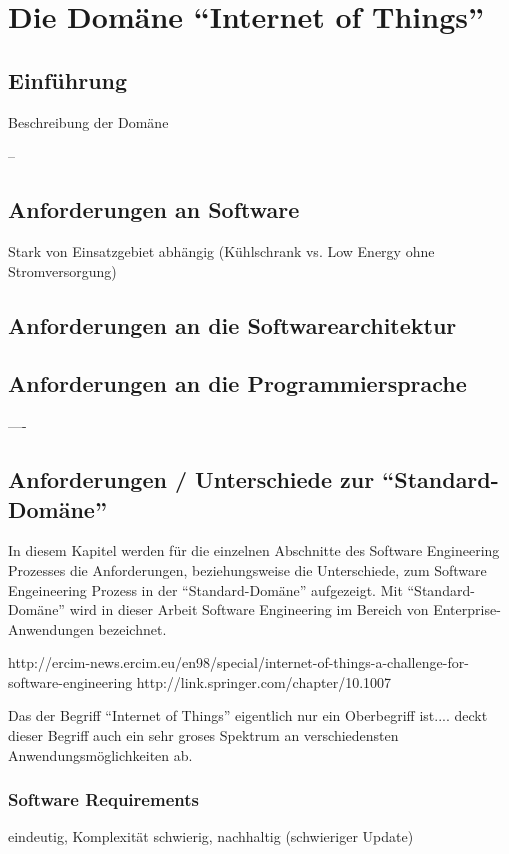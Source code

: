 \chapter{Die Domäne "`Internet of Things"'}

\section{Einführung}
Beschreibung der Domäne

--
\section{Anforderungen an Software}
Stark von Einsatzgebiet abhängig (Kühlschrank vs. Low Energy ohne Stromversorgung)


\section{Anforderungen an die Softwarearchitektur}

\section{Anforderungen an die Programmiersprache}

----

\section{Anforderungen / Unterschiede zur "`Standard-Domäne"'}
In diesem Kapitel werden für die einzelnen Abschnitte des Software Engineering Prozesses die Anforderungen, beziehungsweise die Unterschiede, zum Software Engeineering Prozess in der "`Standard-Domäne"' aufgezeigt. Mit "`Standard-Domäne"' wird in dieser Arbeit Software Engineering im Bereich von Enterprise-Anwendungen bezeichnet.

http://ercim-news.ercim.eu/en98/special/internet-of-things-a-challenge-for-software-engineering
http://link.springer.com/chapter/10.1007%

Das der Begriff "`Internet of Things"' eigentlich nur ein Oberbegriff ist....
deckt dieser Begriff auch ein sehr groses Spektrum an verschiedensten Anwendungsmöglichkeiten ab.

\subsection{Software Requirements}
eindeutig, Komplexität schwierig, nachhaltig (schwieriger Update)

